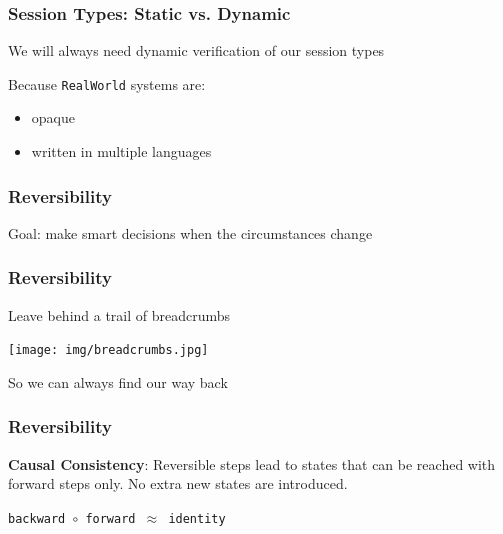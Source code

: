 \documentclass[12pt]{beamer}
\begin{document}
\begin{frame}
\frametitle{Session Types: Static vs. Dynamic}
\begin{center}

    \Large{We will always need dynamic verification of our session types}

\end{center}
Because \texttt{RealWorld} systems are: 


\begin{itemize}
    \item opaque
    \item written in multiple languages
\end{itemize}

\end{frame}


\begin{frame}
\frametitle{Reversibility}

\begin{center}
    \Large{Goal: make smart decisions when the circumstances change} 


    
\end{center}

\end{frame}



\begin{frame}
\frametitle{Reversibility}


\begin{center}
    \Large{Leave behind a trail of breadcrumbs} 
    \begin{center}
        \texttt{[image: img/breadcrumbs.jpg]}
    \end{center}
So we can always find our way back
\end{center}
\end{frame}


\begin{frame}
\frametitle{Reversibility}

\textbf{Causal Consistency}: Reversible steps lead to states that can be reached with forward steps only. No extra new states are introduced.

\begin{center}
    \Large{\texttt{backward $\circ$ forward $\approx$ identity}}
\end{center}




\end{frame}
\end{document}
